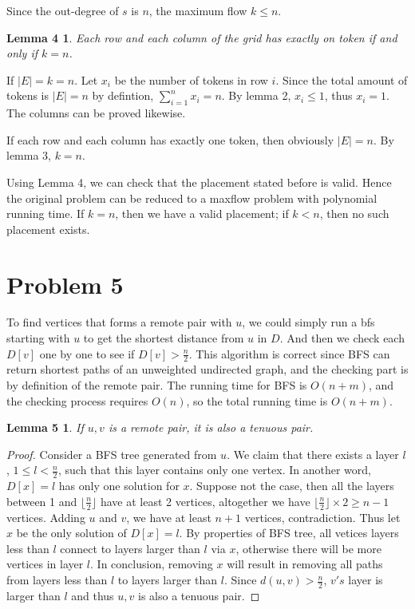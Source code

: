 \documentclass{report}
\def\floor#1{\lfloor{} #1 \rfloor{}}
\begin{document}
    Since the out-degree of $s$ is $n$, the maximum flow $k \le n$.
    \newtheorem*{l4}{Lemma 4}
    \begin{l4}
        Each row and each column of the grid has exactly on token if and only if $k = n$.
    \end{l4}
    If $|E| = k = n$. Let $x_i$ be the number of tokens in row $i$. Since the total amount
    of tokens is $|E| = n$ by defintion, $\sum_{i=1}^n x_i = n$. By lemma 2, $x_i \le 1$,
    thus $x_i = 1$. The columns can be proved likewise.

    If each row and each column has exactly one token, then obviously $|E| = n$. By lemma 3,
    $k = n$. 

    Using Lemma 4, we can check that the placement stated before is valid. Hence the 
    original problem can be reduced to a maxflow problem with polynomial running time.
    If $k = n$, then we have a valid placement; if $k < n$, then no such placement exists.

    \section*{Problem 5}
    To find vertices that forms a remote pair with $u$, we could simply run a bfs starting
    with $u$ to get the shortest distance from $u$ in $D$. And then we check each $D[v]$ 
    one by one to see if $D[v] > \frac{n}{2}$. This algorithm is correct since BFS can 
    return shortest paths of an unweighted undirected graph, and the checking part is by 
    definition of the remote pair. The running time for BFS is $O(n+m)$, and the checking 
    process requires $O(n)$, so the total running time is $O(n+m)$.

    \newtheorem*{l5}{Lemma 5}
    \begin{l5}
        If $u, v$ is a remote pair, it is also a tenuous pair.
    \end{l5}

    \begin{proof}
        Consider a BFS tree generated from $u$. We claim that there exists a layer $l$, 
        $1 \le l < \frac{n}{2}$, such that this layer contains only one vertex. 
        In another word, $D[x] = l$ has only one solution for $x$. Suppose not the case,
        then all the layers between 1 and $\floor{\frac{n}{2}}$ have at least 2 vertices, 
        altogether we have $\floor{\frac{n}{2}} \times 2 \ge n-1$ vertices. Adding $u$ and
        $v$, we have at least $n+1$ vertices, contradiction. Thus let $x$ be the only
        solution of $D[x] = l$. By properties of BFS tree, all vetices layers less than $l$ 
        connect to layers larger than $l$ via $x$, otherwise there will be more vertices in 
        layer $l$. In conclusion, removing $x$ will result in removing all paths from 
        layers less than $l$ to layers larger than $l$. Since $d(u, v) > \frac{n}{2}$,
        $v's$ layer is larger than $l$ and thus $u, v$ is also a tenuous pair.
    \end{proof}
\end{document}
